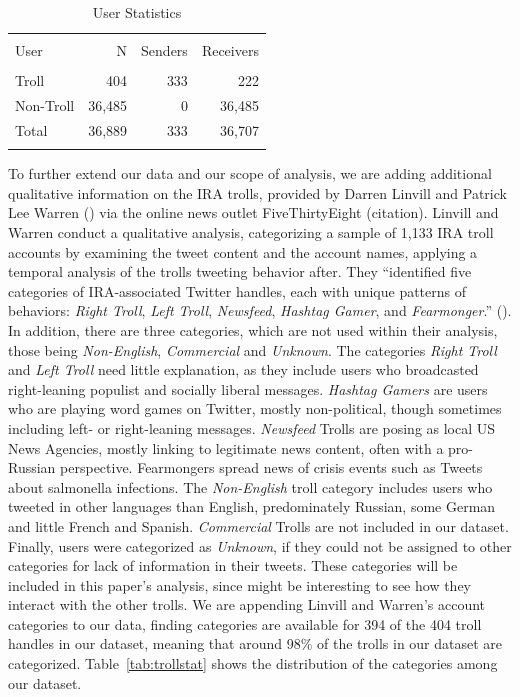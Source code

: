 \documentclass[12pt, titlepage=true, toc=bib]{scrartcl}
\begin{document}
\begin{table}[ht] \centering 
\begin{tabular*}{.95\linewidth}{@{\extracolsep{\fill}} lrrr} 
\\[-1.8ex]\hline 
\hline \\[-1.8ex] 
User & N & Senders & Receivers \\ 
\hline \\[-1.8ex] 
Troll & 404 & 333 & 222 \\ 
Non-Troll & 36,485 & 0 & 36,485 \\ 
Total & 36,889 & 333 & 36,707 \\ 
\hline \\[-1.8ex] 
\end{tabular*} 
  \caption{User Statistics}
  \label{tab:userstat} 
\end{table} 

To further extend our data and our scope of analysis, we are adding additional qualitative information on the IRA trolls, provided by Darren Linvill and Patrick Lee Warren (\cite*{linvill_troll_2018}) via the online news outlet FiveThirtyEight (citation). Linvill and Warren conduct a qualitative analysis, categorizing a sample of 1,133 IRA troll accounts by examining the tweet content and the account names, applying a temporal analysis of the trolls tweeting behavior after. They ``identified five categories of IRA-associated Twitter handles, each with unique patterns of behaviors: \textit{Right Troll}, \textit{Left Troll}, \textit{Newsfeed}, \textit{Hashtag Gamer}, and \textit{Fearmonger}.'' (\cite[6]{linvill_troll_2018}). In addition, there are three categories, which are not used within their analysis, those being \textit{Non-English}, \textit{Commercial} and \textit{Unknown}. The categories \textit{Right Troll} and \textit{Left Troll} need little explanation, as they include users who broadcasted right-leaning populist and socially liberal messages. \textit{Hashtag Gamers} are users who are playing word games on Twitter, mostly non-political, though sometimes including left- or right-leaning messages. \textit{Newsfeed} Trolls are posing as local US News Agencies, mostly linking to legitimate news content, often with a pro-Russian perspective. Fearmongers spread news of crisis events such as Tweets about salmonella infections. The \textit{Non-English} troll category includes users who tweeted in other languages than English, predominately Russian, some German and little French and Spanish. \textit{Commercial} Trolls are not included in our dataset. Finally, users were categorized as \textit{Unknown}, if they could not be assigned to other categories for lack of information in their tweets. These categories will be included in this paper's analysis, since might be interesting to see how they interact with the other trolls. We are appending Linvill and Warren's account categories to our data, finding categories are available for 394 of the 404 troll handles in our dataset, meaning that around 98\% of the trolls in our dataset are categorized. Table~\ref{tab:trollstat} shows the distribution of the categories among our dataset.
\end{document}
